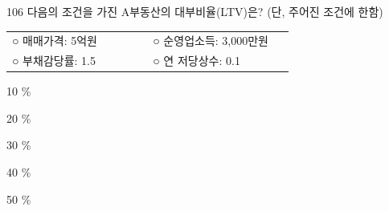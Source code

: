 \begin{question}{106}
다음의 조건을 가진 A부동산의 대부비율(LTV)은? (단, 주어진 조건에 한함)
\begin{framedtext}
\begin{tabular}{@{}p{0.45\linewidth}p{0.45\linewidth}@{}}
○ 매매가격: 5억원 & ○ 순영업소득: 3,000만원 \\
○ 부채감당률: 1.5 & ○ 연 저당상수: 0.1
\end{tabular}
\end{framedtext}
\begin{choices}
  \item 10 \%
  \item 20 \%
  \item 30 \%
  \item 40 \%
  \item 50 \%
\end{choices}
\end{question}
